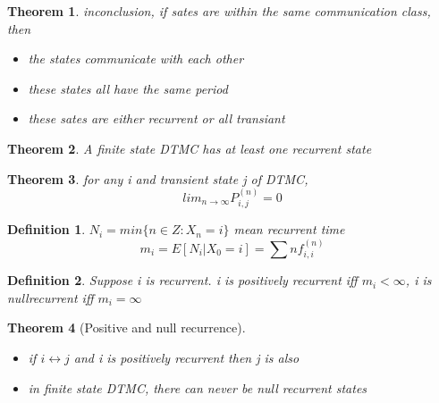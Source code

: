 \documentclass[10pt]{article}
\theoremstyle{break}
\newtheorem{thm}{Theorem}[subsection]
\newtheorem{defn}{Definition}[subsection]
\begin{document}
            \begin{thm}
                inconclusion, if sates are within the same communication class, then\\
                \begin{itemize}
                    \item the states communicate with each other 
                    \item these states all have the same period
                    \item these sates are either recurrent or all transiant
                \end{itemize}
            \end{thm}
            \begin{thm}
                A finite state DTMC has at least one recurrent state
            \end{thm}
            \begin{thm}
                for any i and transient state j of DTMC, $$lim_{n\rightarrow \infty}P_{i,j}^{(n)}=0$$
            \end{thm}
            \begin{defn}
                $N_i=min\{n\in Z:X_n=i\}$
                mean recurrent time $$m_i=E[N_i|X_0=i]=\sum nf_{i,i}^{(n)}$$
            \end{defn}
            \begin{defn}
                Suppose i is recurrent. i is positively recurrent iff $m_i < \infty$, 
                i is nullrecurrent iff $m_i=\infty$
            \end{defn}
            \begin{thm}[Positive and null recurrence]
                \begin{itemize}
                    \item if $i\leftrightarrow j$ and i is positively recurrent then j is also
                    \item in finite state DTMC, there can never be null recurrent states 
                \end{itemize}
            \end{thm}
\end{document}
